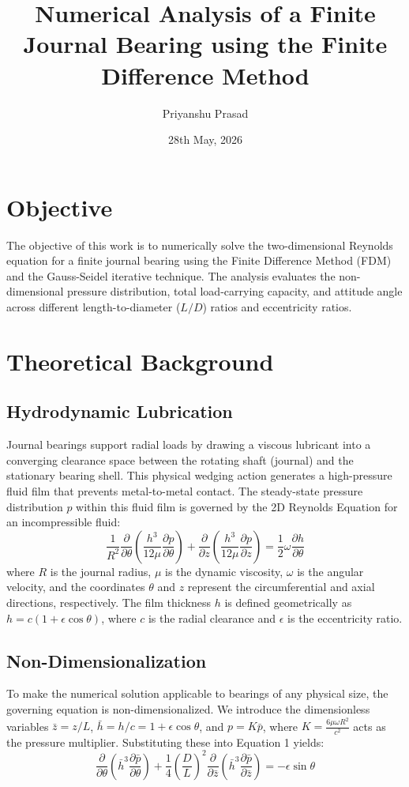 \documentclass[12pt, a4paper]{article}
\title{\textbf{Numerical Analysis of a Finite Journal Bearing using the Finite Difference Method}}
\author{Priyanshu Prasad}
\date{28th May, 2026}
\begin{document}
\maketitle

\section{Objective}
The objective of this work is to numerically solve the two-dimensional Reynolds equation for a finite journal bearing using the Finite Difference Method (FDM) and the Gauss-Seidel iterative technique. The analysis evaluates the non-dimensional pressure distribution, total load-carrying capacity, and attitude angle across different length-to-diameter ($L/D$) ratios and eccentricity ratios.

\section{Theoretical Background}

\subsection{Hydrodynamic Lubrication}
Journal bearings support radial loads by drawing a viscous lubricant into a converging clearance space between the rotating shaft (journal) and the stationary bearing shell. This physical wedging action generates a high-pressure fluid film that prevents metal-to-metal contact. The steady-state pressure distribution $p$ within this fluid film is governed by the 2D Reynolds Equation for an incompressible fluid:
\begin{equation}
\frac{1}{R^2}\frac{\partial}{\partial\theta}\left(\frac{h^3}{12\mu}\frac{\partial p}{\partial\theta}\right) + \frac{\partial}{\partial z}\left(\frac{h^3}{12\mu}\frac{\partial p}{\partial z}\right) = \frac{1}{2}\omega\frac{\partial h}{\partial\theta}
\end{equation}
where $R$ is the journal radius, $\mu$ is the dynamic viscosity, $\omega$ is the angular velocity, and the coordinates $\theta$ and $z$ represent the circumferential and axial directions, respectively. The film thickness $h$ is defined geometrically as $h = c(1 + \epsilon \cos\theta)$, where $c$ is the radial clearance and $\epsilon$ is the eccentricity ratio.

\subsection{Non-Dimensionalization}
To make the numerical solution applicable to bearings of any physical size, the governing equation is non-dimensionalized. We introduce the dimensionless variables $\bar{z} = z/L$, $\bar{h} = h/c = 1 + \epsilon \cos\theta$, and $p = K\bar{p}$, where $K = \frac{6\mu\omega R^2}{c^2}$ acts as the pressure multiplier. Substituting these into Equation 1 yields:
\begin{equation}
\frac{\partial}{\partial\theta}\left(\bar{h}^3 \frac{\partial\bar{p}}{\partial\theta}\right) + \frac{1}{4}\left(\frac{D}{L}\right)^2 \frac{\partial}{\partial\bar{z}}\left(\bar{h}^3 \frac{\partial\bar{p}}{\partial\bar{z}}\right) = -\epsilon\sin\theta
\end{equation}
\end{document}

